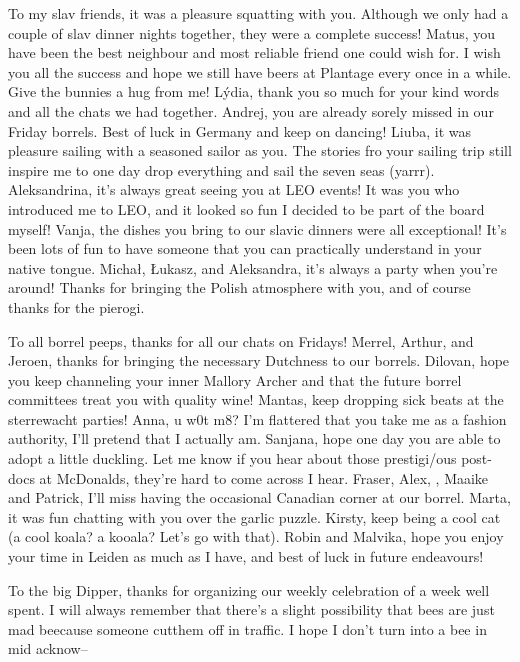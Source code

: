 \begin{thesisacknowledgements}
\begin{changemargin}{-0.3cm}{-0.3cm}
{    To my slav friends, it was a pleasure squatting with you. Although we only had a couple of slav dinner nights together, they were a complete success! Matus, you have been the best neighbour and most reliable friend one could wish for. I wish you all the success and hope we still have beers at Plantage every once in a while. Give the bunnies a hug from me! L\'ydia, thank you so much for your kind words and all the chats we had together. Andrej, you are already sorely missed in our Friday borrels. Best of luck in Germany and keep on dancing! Liuba, it was pleasure sailing with a seasoned sailor as you. The stories fro your sailing trip still inspire me to one day drop everything and sail the seven seas (yarrr). Aleksandrina, it's always great seeing you at LEO events! It was you who introduced me to LEO, and it looked so fun I decided to be part of the board myself! Vanja, the dishes you bring to our slavic dinners were all exceptional! It's been lots of fun to have someone that you can practically understand in your native tongue.  Micha\l{}, \L{}ukasz, and Aleksandra, it's always a party when you're around! Thanks for bringing the Polish atmosphere with you, and of course thanks for the pierogi.

    To all borrel peeps, thanks for all our chats on Fridays! Merrel, Arthur, and Jeroen, thanks for bringing the necessary Dutchness to our borrels. Dilovan, hope you keep channeling your inner Mallory Archer and that the future borrel committees treat you with quality wine! Mantas, keep dropping sick beats at the sterrewacht parties! Anna, u w0t m8? I'm flattered that you take me as a fashion authority, I'll pretend that I actually am. Sanjana, hope one day you are able to adopt a little duckling. Let me know if you hear about those prestigi/ous post-docs at McDonalds, they're hard to come across I hear. Fraser, Alex, , Maaike and Patrick, I'll miss having the occasional Canadian corner at our borrel. Marta, it was fun chatting with you over the garlic puzzle. Kirsty, keep being a cool cat (a cool koala? a kooala? Let's go with that). Robin and Malvika, hope you enjoy your time in Leiden as much as I have, and best of luck in future endeavours!

    To the big Dipper, thanks for organizing our weekly celebration of a week well spent. I will always remember that there's a slight possibility that bees  are just mad  beecause someone cutthem off in traffic. I hope I don't turn into a bee in mid acknow--

}
\end{changemargin}
\end{thesisacknowledgements}
